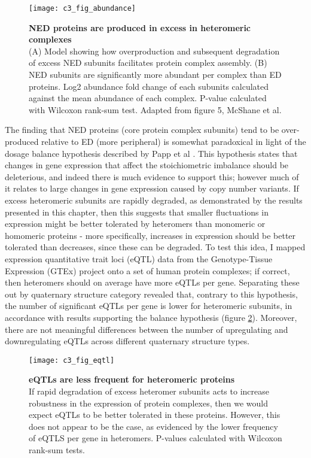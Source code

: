 \documentclass[a4paper,11pt,twoside,openright]{scrbook}
\begin{document}
\begin{figure}[h]
\fcapsideright
    {\caption[NED proteins are produced in excess in heteromeric complexes]{\sffamily\textbf{NED proteins are produced in excess in heteromeric complexes} \\ \small (A) Model showing how overproduction and subsequent degradation of excess NED subunits facilitates protein complex assembly. (B) NED subunits are significantly more abundant per complex than ED proteins. Log2 abundance fold change of each subunits calculated against the mean abundance of each complex. P-value calculated with Wilcoxon rank-sum test. Adapted from figure 5, McShane et al. \cite{McShane2016}}\label{figure:nedabundance}}
    {\texttt{[image: c3\_fig\_abundance]}}
\end{figure}

The finding that NED proteins (core protein complex subunits) tend to be over-produced relative to ED (more peripheral) is somewhat paradoxical in light of the dosage balance hypothesis described by Papp et al \cite{Papp2003}. This hypothesis states that changes in gene expression that affect the stoichiometric imbalance should be deleterious, and indeed there is much evidence to support this; however much of it relates to large changes in gene expression caused by copy number variants. If excess heteromeric subunits are rapidly degraded, as demonstrated by the results presented in this chapter, then this suggests that smaller fluctuations in expression might be better tolerated by heteromers than monomeric or homomeric proteins - more specifically, increases in expression should be better tolerated than decreases, since these can be degraded. To test this idea, I mapped expression quantitative trait loci (eQTL) data from the Genotype-Tissue Expression \cite{Brown2016} (GTEx) project onto a set of human protein complexes; if correct, then heteromers should on average have more eQTLs per gene. Separating these out by quaternary structure category revealed that, contrary to this hypothesis, the number of significant eQTLs per gene is lower for heteromeric subunits, in accordance with results supporting the balance hypothesis (figure \ref{figure:eqtls}). Moreover, there are not meaningful differences between the number of upregulating and downregulating eQTLs across different quaternary structure types.

\begin{figure}[h]
\fcapsideright
    {\caption[eQTLs are less frequent for heteromeric proteins]{\sffamily\textbf{eQTLs are less frequent for heteromeric proteins} \\ \small If rapid degradation of excess heteromer subunits acts to increase robustness in the expression of protein complexes, then we would expect eQTLs to be better tolerated in these proteins. However, this does not appear to be the case, as evidenced by the lower frequency of eQTLS per gene in heteromers. P-values calculated with Wilcoxon rank-sum tests.}\label{figure:eqtls}}
    {\texttt{[image: c3\_fig\_eqtl]}}
\end{figure}
\end{document}
